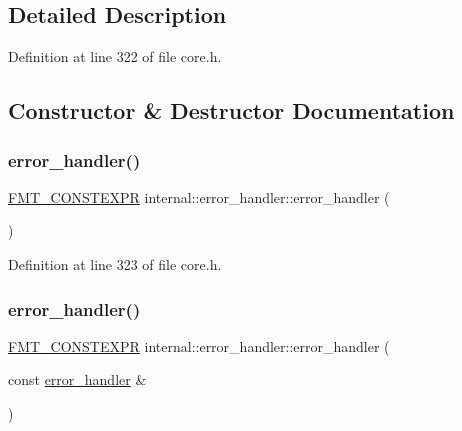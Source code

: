 \subsection{Detailed Description}


Definition at line 322 of file core.\+h.



\subsection{Constructor \& Destructor Documentation}
\mbox{\label{structinternal_1_1error__handler_a20cac4586ccce09e435ba4d25f08bf26}} 
\subsubsection{\texorpdfstring{error\+\_\+handler()}{error\_handler()}\hspace{0.1cm}{\footnotesize\ttfamily [1/2]}}
{\footnotesize\ttfamily \hyperlink{core_8h_a69201cb276383873487bf68b4ef8b4cd}{F\+M\+T\+\_\+\+C\+O\+N\+S\+T\+E\+X\+PR} internal\+::error\+\_\+handler\+::error\+\_\+handler (\begin{DoxyParamCaption}{ }\end{DoxyParamCaption})\hspace{0.3cm}{\ttfamily [inline]}}



Definition at line 323 of file core.\+h.

\mbox{\label{structinternal_1_1error__handler_a76c57bba990794c50ef4a5eb2457708d}} 
\subsubsection{\texorpdfstring{error\+\_\+handler()}{error\_handler()}\hspace{0.1cm}{\footnotesize\ttfamily [2/2]}}
{\footnotesize\ttfamily \hyperlink{core_8h_a69201cb276383873487bf68b4ef8b4cd}{F\+M\+T\+\_\+\+C\+O\+N\+S\+T\+E\+X\+PR} internal\+::error\+\_\+handler\+::error\+\_\+handler (\begin{DoxyParamCaption}\item[{const \hyperlink{structinternal_1_1error__handler}{error\+\_\+handler} \&}]{ }\end{DoxyParamCaption})\hspace{0.3cm}{\ttfamily [inline]}}



